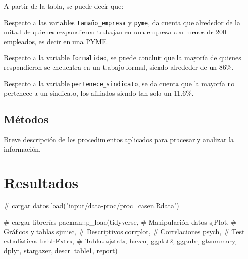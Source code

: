 \documentclass[
  a4paper,
  oneside]{scrbook}
\newenvironment{Shaded}{\begin{snugshade}}{\end{snugshade}}
\newcommand{\CommentTok}[1]{\textcolor[rgb]{0.37,0.37,0.37}{#1}}
\newcommand{\FunctionTok}[1]{\textcolor[rgb]{0.28,0.35,0.67}{#1}}
\newcommand{\NormalTok}[1]{\textcolor[rgb]{0.00,0.23,0.31}{#1}}
\newcommand{\SpecialCharTok}[1]{\textcolor[rgb]{0.37,0.37,0.37}{#1}}
\newcommand{\StringTok}[1]{\textcolor[rgb]{0.13,0.47,0.30}{#1}}
\begin{document}
A partir de la tabla, se puede decir que:

Respecto a las variables \texttt{tamaño\_empresa} y \texttt{pyme}, da
cuenta que alrededor de la mitad de quienes respondieron trabajan en una
empresa con menos de 200 empleados, es decir en una PYME.

Respecto a la variable \texttt{formalidad}, se puede concluir que la
mayoría de quienes respondieron se encuentra en un trabajo formal,
siendo alrededor de un 86\%.

Respecto a la variable \texttt{pertenece\_sindicato}, se da cuenta que
la mayoría no pertenece a un sindicato, los afiliados siendo tan solo un
11.6\%.

\section{Métodos}\label{muxe9todos}

Breve descripción de los procedimientos aplicados para procesar y
analizar la información.


\chapter{Resultados}\label{resultados}

\begin{Shaded}
\begin{Highlighting}[]
\CommentTok{\# cargar datos}
\FunctionTok{load}\NormalTok{(}\StringTok{"input/data{-}proc/proc\_casen.Rdata"}\NormalTok{)}

\CommentTok{\# cargar librerías}
\NormalTok{pacman}\SpecialCharTok{::}\FunctionTok{p\_load}\NormalTok{(tidyverse, }\CommentTok{\# Manipulación datos}
\NormalTok{               sjPlot, }\CommentTok{\# Gráficos y tablas}
\NormalTok{               sjmisc, }\CommentTok{\# Descriptivos}
\NormalTok{               corrplot, }\CommentTok{\# Correlaciones}
\NormalTok{               psych, }\CommentTok{\# Test estadísticos}
\NormalTok{               kableExtra, }\CommentTok{\# Tablas}
\NormalTok{               sjstats,}
\NormalTok{               haven,}
\NormalTok{               ggplot2,}
\NormalTok{               ggpubr,}
\NormalTok{               gtsummary,}
\NormalTok{               dplyr,}
\NormalTok{               stargazer,}
\NormalTok{               descr,}
\NormalTok{               table1,}
\NormalTok{               report)}
\end{Highlighting}
\end{Shaded}
\end{document}

